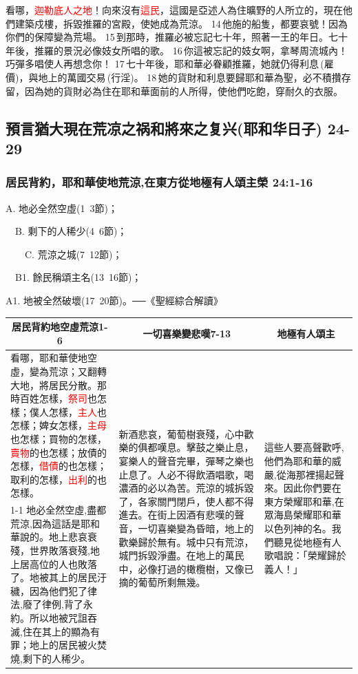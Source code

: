 看哪，\textcolor{red}{迦勒底人之地}！向來沒有\textcolor{red}{這民}，這國是亞述人為住曠野的人所立的，現在他們建築戍樓，拆毀推羅的宮殿，使她成為荒涼。 14 他施的船隻，都要哀號！因為你們的保障變為荒場。 15 到那時，推羅必被忘記七十年，照著一王的年日。七十年後，推羅的景況必像妓女所唱的歌。 16 你這被忘記的妓女啊，拿琴周流城內！巧彈多唱使人再想念你！ 17 七十年後，耶和華必眷顧推羅，她就仍得利息 (雇價)，與地上的萬國交易 (行淫)。 18 她的貨財和利息要歸耶和華為聖，必不積攢存留，因為她的貨財必為住在耶和華面前的人所得，使他們吃飽，穿耐久的衣服。

\subsection{預言猶大現在荒凉之祸和將來之复兴(耶和华日子) 24-29}
\subsubsection{居民背約，耶和華使地荒涼,在東方從地極有人頌主榮 24:1-16}
A. 地必全然空虛(1~3節)；

 　B. 剩下的人稀少(4~6節)；

 　　C. 荒涼之城(7~12節)；

 　B1. 餘民稱頌主名(13~16節)；

A1. 地被全然破壞(17~20節)。──《聖經綜合解讀》

\begin{table}[H]
\centering
\begin{tabular}{p{7.75cm}|p{6.150cm}|p{3.10cm}}\hline\hline
\multicolumn{1}{c|}{居民背約地空虛荒涼1-6}&\multicolumn{1}{c|}{一切喜樂變悲嘆7-13}&\multicolumn{1}{c}{地極有人頌主}\\\hline
看哪，耶和華使地空虛，變為荒涼；又翻轉大地，將居民分散。那時百姓怎樣，\textcolor{red}{祭司}也怎樣；僕人怎樣，\textcolor{red}{主人}也怎樣；婢女怎樣，\textcolor{red}{主母}也怎樣；買物的怎樣，\textcolor{red}{賣物}的也怎樣；放債的怎樣，\textcolor{red}{借債}的也怎樣；取利的怎樣，\textcolor{red}{出利}的也怎樣。 
&\multirow{2}{6.cm}{新酒悲哀，葡萄樹衰殘，心中歡樂的俱都嘆息。擊鼓之樂止息，宴樂人的聲音完畢，彈琴之樂也止息了。人必不得飲酒唱歌，喝濃酒的必以為苦。荒涼的城拆毀了，各家關門閉戶，使人都不得進去。在街上因酒有悲嘆的聲音，一切喜樂變為昏暗，地上的歡樂歸於無有。城中只有荒涼，城門拆毀淨盡。在地上的萬民中，必像打過的橄欖樹，又像已摘的葡萄所剩無幾。}
&\multirow{2}{3.cm}{這些人要高聲歡呼,他們為耶和華的威嚴,從海那裡揚起聲來。因此你們要在東方榮耀耶和華,在眾海島榮耀耶和華以色列神的名。我們聽見從地極有人歌唱說：「榮耀歸於義人！」}\\\cline{1-1}
地必全然空虛,盡都荒涼,因為這話是耶和華說的。地上悲哀衰殘，世界敗落衰殘,地上居高位的人也敗落了。地被其上的居民汙穢，因為他們犯了律法,廢了律例,背了永約。所以地被咒詛吞滅,住在其上的顯為有罪；地上的居民被火焚燒,剩下的人稀少。
&&\\\hline
\end{tabular}
\end{table}

